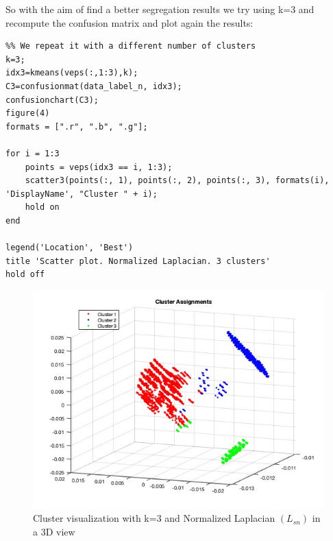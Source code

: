 \documentclass[12pt]{article}
\begin{document}
So with the aim of find a better segregation results we try using k=3 and recompute the confusion matrix and plot again the results:
\smallskip

\begin{lstlisting}
%% We repeat it with a different number of clusters
k=3;
idx3=kmeans(veps(:,1:3),k);
C3=confusionmat(data_label_n, idx3);
confusionchart(C3);
figure(4)
formats = [".r", ".b", ".g"];

for i = 1:3
    points = veps(idx3 == i, 1:3);
    scatter3(points(:, 1), points(:, 2), points(:, 3), formats(i), 'DisplayName', "Cluster " + i);
    hold on
end

legend('Location', 'Best')
title 'Scatter plot. Normalized Laplacian. 3 clusters'
hold off
\end{lstlisting}

\begin{figure}[H]
	\centering
	\includegraphics[width=12cm]{3DNormalizedLaplaciank3.jpeg}
	\caption{Cluster visualization with k=3 and Normalized Laplacian $(L_{sn})$ in a 3D view}
	\label{fig:3DnormLapl3clusters}
\end{figure}
\end{document}
